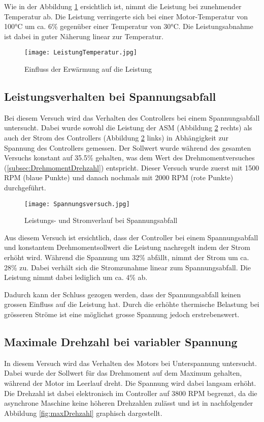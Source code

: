 Wie in der Abbildung \ref{fig:Leistung/Temperatur} ersichtlich ist, nimmt die Leistung bei zunehmender Temperatur ab. Die Leistung verringerte sich bei einer Motor-Temperatur von 100°C um ca. 6\% gegenüber einer Temperatur von 30°C. Die Leistungsabnahme ist dabei in guter Näherung linear zur Temperatur.

\begin{figure}[H]
	\centering
	\texttt{[image: LeistungTemperatur.jpg]}
	\caption{Einfluss der Erwärmung auf die Leistung}\label{fig:Leistung/Temperatur}
\end{figure}

\subsection{Leistungsverhalten bei Spannungsabfall}\label{subsec:LeistungSpannungabfall}
Bei diesem Versuch wird das Verhalten des Controllers bei einem Spannungsabfall untersucht. Dabei wurde sowohl die Leistung der ASM (Abbildung \ref{fig:Spannungsabfall} rechts) als auch der Strom des Controllers (Abbildung \ref{fig:Spannungsabfall} links) in Abhängigkeit zur Spannung des Controllers gemessen. Der Sollwert wurde während des gesamten Versuchs konstant auf 35.5\% gehalten, was dem Wert des Drehmomentversuches (\ref{subsec:DrehmomentDrehzahl}) entspricht. Dieser Versuch wurde zuerst mit 1500 RPM (blaue Punkte) und danach nochmals mit 2000 RPM (rote Punkte) durchgeführt.

\begin{figure}[H]
	\centering
	\texttt{[image: Spannungsversuch.jpg]}
	\caption{Leistungs- und Stromverlauf bei Spannungsabfall}\label{fig:Spannungsabfall}
\end{figure}

Aus diesem Versuch ist ersichtlich, dass der Controller bei einem Spannungsabfall und konstantem Drehmomentsollwert die Leistung nachregelt indem der Strom erhöht wird. Während die Spannung um 32\% abfällt, nimmt der Strom um ca. 28\% zu. Dabei verhält sich die Stromzunahme linear zum Spannungsabfall. Die Leistung nimmt dabei lediglich um ca. 4\% ab.

Dadurch kann der Schluss gezogen werden, dass der Spannungsabfall keinen grossen Einfluss auf die Leistung hat. Durch die erhöhte thermische Belastung bei grösseren Ströme ist eine möglichst grosse Spannung jedoch erstrebenswert.

\subsection{Maximale Drehzahl bei variabler Spannung}\label{subsec:DrehzahlSpanungsabfall}
In diesem Versuch wird das Verhalten des Motors bei Unterspannung untersucht. Dabei wurde der Sollwert für das Drehmoment auf dem Maximum gehalten, während der Motor im Leerlauf dreht. Die Spannung wird dabei langsam erhöht. Die Drehzahl ist dabei elektronisch im Controller auf 3800 RPM begrenzt, da die asynchrone Maschine keine höheren Drehzahlen zulässt und ist in nachfolgender Abbildung \ref{fig:maxDrehzahl} graphisch dargestellt.

